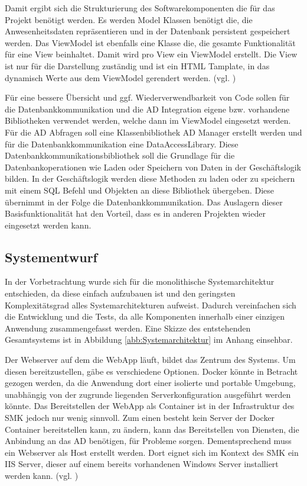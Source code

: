 Damit ergibt sich die Strukturierung des Softwarekomponenten die für das Projekt benötigt werden. Es werden Model Klassen benötigt die, die Anwesenheitsdaten repräsentieren und in der Datenbank persistent gespeichert werden. Das ViewModel ist ebenfalls eine Klasse die, die gesamte Funktionalität für eine View beinhaltet. Damit wird pro View ein ViewModel erstellt. Die View ist nur für die Darstellung zuständig und ist ein HTML Tamplate, in das dynamisch Werte aus dem ViewModel gerendert werden. (vgl. \cite{MVVM})

Für eine bessere Übersicht und ggf. Wiederverwendbarkeit von Code sollen für die Datenbankkommunikation und die AD Integration eigene bzw. vorhandene Bibliotheken verwendet werden, welche dann im ViewModel eingesetzt werden. Für die AD Abfragen soll eine Klassenbibliothek AD Manager erstellt werden und für die Datenbankkommunikation eine DataAccessLibrary. Diese Datenbankkommunikationsbibliothek soll die Grundlage für die Datenbankoperationen wie Laden oder Speichern von Daten in der Geschäftslogik bilden. In der Geschäftslogik werden diese Methoden zu laden oder zu speichern mit einem SQL Befehl und Objekten an diese Bibliothek übergeben. Diese übernimmt in der Folge die Datenbankkommunikation. Das Auslagern dieser Basisfunktionalität hat den Vorteil, dass es in anderen Projekten wieder eingesetzt werden kann.

\subsection{Systementwurf}
\label{sec:Systementwurf}
In der Vorbetrachtung wurde sich für die monolithische Systemarchitektur entschieden, da diese einfach aufzubauen ist und den geringsten Komplexitätsgrad alles Systemarchitekturen aufweist. Dadurch vereinfachen sich die Entwicklung und die Tests, da alle Komponenten innerhalb einer einzigen Anwendung zusammengefasst werden. Eine Skizze des entstehenden Gesamtsystems ist in Abbildung \ref{abb:Systemarchitektur} im Anhang einsehbar.

Der Webserver auf dem die WebApp läuft, bildet das Zentrum des Systems. Um diesen bereitzustellen, gäbe es verschiedene Optionen. Docker könnte in Betracht gezogen werden, da die Anwendung dort einer isolierte und portable Umgebung, unabhängig von der zugrunde liegenden Serverkonfiguration ausgeführt werden könnte. Das Bereitstellen der WebApp als Container ist in der Infrastruktur des SMK jedoch nur wenig sinnvoll. Zum einen besteht kein Server der Docker Container bereitstellen kann, zu ändern, kann das Bereitstellen von Diensten, die Anbindung an das AD benötigen, für Probleme sorgen. Dementsprechend muss ein Webserver als Host erstellt werden. Dort eignet sich im Kontext des SMK ein IIS Server, dieser auf einem bereits vorhandenen Windows Server installiert werden kann. (vgl. \cite{Architekturen})

